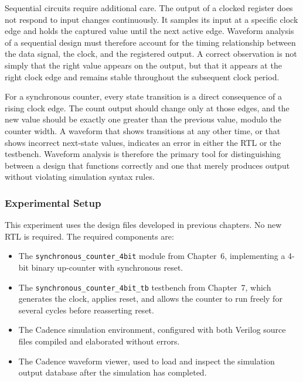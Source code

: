 Sequential circuits require additional care. The output of a clocked register
does not respond to input changes continuously. It samples its input at a
specific clock edge and holds the captured value until the next active edge.
Waveform analysis of a sequential design must therefore account for the
timing relationship between the data signal, the clock, and the registered
output. A correct observation is not simply that the right value appears on the
output, but that it appears at the right clock edge and remains stable
throughout the subsequent clock period.

For a synchronous counter, every state transition is a direct consequence of a
rising clock edge. The count output should change only at those edges, and the
new value should be exactly one greater than the previous value, modulo the
counter width. A waveform that shows transitions at any other time, or that
shows incorrect next-state values, indicates an error in either the RTL or the
testbench. Waveform analysis is therefore the primary tool for distinguishing
between a design that functions correctly and one that merely produces output
without violating simulation syntax rules.

\subsubsection{Experimental Setup}
\label{sec:sim-lab-setup}

This experiment uses the design files developed in previous chapters. No new
RTL is required. The required components are:

\begin{itemize}
    \item The \texttt{synchronous\_counter\_4bit} module from Chapter~6,
          implementing a 4-bit binary up-counter with synchronous reset.
    \item The \texttt{synchronous\_counter\_4bit\_tb} testbench from Chapter~7,
          which generates the clock, applies reset, and allows the counter to
          run freely for several cycles before reasserting reset.
    \item The Cadence simulation environment, configured with both Verilog
          source files compiled and elaborated without errors.
    \item The Cadence waveform viewer, used to load and inspect the simulation
          output database after the simulation has completed.
\end{itemize}

